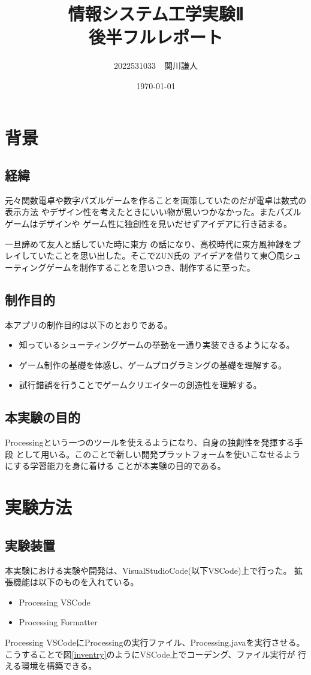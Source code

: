 \documentclass[a4paper,titlepage,11pt]{ltjsarticle}
\begin{document}
\title{情報システム工学実験Ⅱ \\後半フルレポート}
\author{2022531033　関川謙人}
\date{\today}
\maketitle
\section{背景}
\subsection{経緯}
元々関数電卓や数字パズルゲームを作ることを画策していたのだが電卓は数式の表示方法
やデザイン性を考えたときにいい物が思いつかなかった。またパズルゲームはデザインや
ゲーム性に独創性を見いだせずアイデアに行き詰まる。

一旦諦めて友人と話していた時に東方
の話になり、高校時代に東方風神録をプレイしていたことを思い出した。そこでZUN氏の
アイデアを借りて東〇風シューティングゲームを制作することを思いつき、制作するに至った。
\subsection{制作目的}
本アプリの制作目的は以下のとおりである。
\begin{itemize}
	\item 知っているシューティングゲームの挙動を一通り実装できるようになる。
	\item ゲーム制作の基礎を体感し、ゲームプログラミングの基礎を理解する。
	\item 試行錯誤を行うことでゲームクリエイターの創造性を理解する。
\end{itemize}
\subsection{本実験の目的}
Processingという一つのツールを使えるようになり、自身の独創性を発揮する手段
として用いる。このことで新しい開発プラットフォームを使いこなせるようにする学習能力を身に着ける
ことが本実験の目的である。
\section{実験方法}
\subsection{実験装置}
本実験における実験や開発は、VisualStudioCode(以下VSCode)上で行った。
拡張機能は以下のものを入れている。
\begin{itemize}
	\item Processing VSCode
	\item Processing Formatter
\end{itemize}
Processing VSCodeにProcessingの実行ファイル、Processing.javaを実行させる。
こうすることで図\ref{inventry}のようにVSCode上でコーデング、ファイル実行が
行える環境を構築できる。
\end{document}
